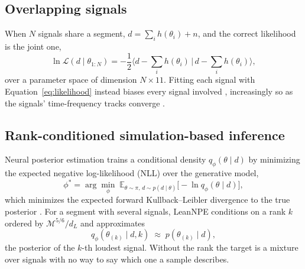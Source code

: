 \documentclass[twocolumn,linenumbers]{aastex701}
\begin{document}
\subsection{Overlapping signals}

When $N$ signals share a segment, $d = \sum_i h(\theta_i) + n$, and the
correct likelihood is the joint one,
\begin{equation}
\ln\mathcal{L}(d \mid \theta_{1:N}) = -\frac{1}{2}\Big\langle d - \sum_i h(\theta_i) \,\Big|\, d - \sum_i h(\theta_i)\Big\rangle,
\label{eq:jointlikelihood}
\end{equation}
over a parameter space of dimension $N\times 11$. Fitting each signal with
Equation~\ref{eq:likelihood} instead biases every signal involved
\citep{Antonelli2021Overlap, Relton2021Overlap}, increasingly so as the
signals' time-frequency tracks converge \citep{Samajdar2021Global}.

\subsection{Rank-conditioned simulation-based inference}

Neural posterior estimation trains a conditional density $q_\phi(\theta\mid d)$
by minimizing the expected negative log-likelihood (NLL) over the generative
model,
\begin{equation}
\phi^* = \arg\min_\phi\; \mathbb{E}_{\theta\sim\pi,\,d\sim p(d\mid\theta)}\big[-\ln q_\phi(\theta\mid d)\big],
\label{eq:sbiobjective}
\end{equation}
which minimizes the expected forward Kullback--Leibler divergence to the true
posterior \citep{Cranmer2020Sbi}. For a segment with several signals, LeanNPE
conditions on a rank $k$ ordered by $\mathcal{M}^{5/6}/d_L$ and approximates
\begin{equation}
q_\phi(\theta_{(k)} \mid d, k) \;\approx\; p(\theta_{(k)} \mid d),
\label{eq:rankposterior}
\end{equation}
the posterior of the $k$-th loudest signal. Without the rank the target is a
mixture over signals with no way to say which one a sample describes.
\end{document}
